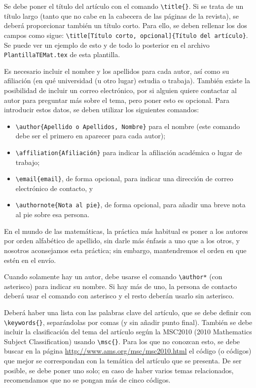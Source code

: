 \documentclass[bibtex]{TEMat-article}
\begin{document}
Se debe poner el título del artículo con el comando \verb+\title{}+.
Si se trata de un título largo (tanto que no cabe en la cabecera de las páginas de la revista), se deberá proporcionar también un título corto.
Para ello, se deben rellenar los dos campos como sigue: \verb+\title[Título corto, opcional]{Título del artículo}+.
Se puede ver un ejemplo de esto y de todo lo posterior en el archivo \verb+PlantillaTEMat.tex+ de esta plantilla.

Es necesario incluir el nombre y los apellidos para cada autor, así como su afiliación (en qué universidad (u otro lugar) estudia o trabaja).
También existe la posibilidad de incluir un correo electrónico, por si alguien quiere contactar al autor para preguntar más sobre el tema, pero poner esto es opcional.
Para introducir estos datos, se deben utilizar los siguientes comandos:
\begin{itemize}
\item \verb+\author{Apellido o Apellidos, Nombre}+ para el nombre (este comando debe ser el primero en aparecer para cada autor);
\item \verb+\affiliation{Afiliación}+ para indicar la afiliación académica o lugar de trabajo;
\item \verb+\email{email}+, de forma opcional, para indicar una dirección de correo electrónico de contacto, y
\item \verb+\authornote{Nota al pie}+, de forma opcional, para añadir una breve nota al pie sobre esa persona.
\end{itemize}
En el mundo de las matemáticas, la práctica más habitual es poner a los autores por orden alfabético de apellido, sin darle más énfasis a uno que a los otros, y nosotros aconsejamos esta práctica; sin embargo, mantendremos el orden en que estén en el envío.

Cuando solamente hay un autor, debe usarse el comando \verb+\author*+ (con asterisco) para indicar su nombre. Si hay más de uno, la persona de contacto deberá usar el comando con asterisco y el resto deberán usarlo sin asterisco.

Deberá haber una lista con las palabras clave del artículo, que se debe definir con \verb+\keywords{}+, separándolas por comas (y sin añadir punto final).
También se debe incluir la clasificación del tema del artículo según la MSC2010 (2010 Mathematics Subject Classification) usando \verb+\msc{}+.
Para los que no conozcan esto, se debe buscar en la página \url{http://www.ams.org/msc/msc2010.html} el código (o códigos) que mejor se correspondan con la temática del artículo que se presenta.
De ser posible, se debe poner uno solo; en caso de haber varios temas relacionados, recomendamos que no se pongan más de cinco códigos.
\end{document}

